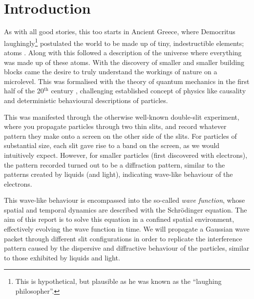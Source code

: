 \section{Introduction}\label{sec:introduction}

As with all good stories, this too starts in Ancient Greece, where Democritus laughingly\footnote{This is hypothetical, but plausible as he was known as the ``laughing philosopher''.} postulated the world to be made up of tiny, indestructible elements; atoms \citep{berryman_2016}. Along with this followed a description of the universe where everything was made up of these atoms. With the discovery of smaller and smaller building blocks came the desire to truly understand the workings of nature on a microlevel. This was formalised with the theory of quantum mechanics in the first half of the 20$^\mathrm{th}$ century \citep{QMH}, challenging established concept of physics like causality and deterministic behavioural descriptions of particles. 

This was manifested through the otherwise well-known double-slit experiment, where you propagate particles through two thin slits, and record whatever pattern they make onto a screen on the other side of the slits. For particles of substantial size, each slit gave rise to a band on the screen, as we would intuitively expect. However, for smaller particles (first discovered with electrons), the pattern recorded turned out to be a diffraction pattern, similar to the patterns created by liquids (and light), indicating wave-like behaviour of the electrons. 

This wave-like behaviour is encompassed into the so-called \textit{wave function}, whose spatial and temporal dynamics are described with the Schrödinger equation. The aim of this report is to solve this equation in a confined spatial environment, effectively evolving the wave function in time. We will propagate a Gaussian wave packet through different slit configurations in order to replicate the interference pattern caused by the dispersive and diffractive behaviour of the particles, similar to those exhibited by liquids and light.

